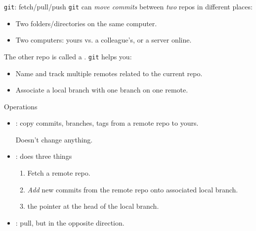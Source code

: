 \documentclass[12pt,aspectratio=169]{beamer}
\begin{document}
\begin{frame}{\texttt{git}: fetch/pull/push}
\texttt{git} can \emph{move commits} between \emph{two} repos in different places:
\begin{itemize}
  \item Two folders/directories on the same computer.
  \item Two computers: yours vs. a colleague's, or a server online.
\end{itemize}

The other repo is called a . \texttt{git} helps you:
  \begin{itemize}
    \item Name and track multiple remotes related to the current repo.
    \item Associate a local branch with one branch on one remote.
  \end{itemize}

Operations
\begin{itemize}
  \item {}: copy commits, branches, tags from a remote repo to yours.

    Doesn't change anything.
  \item {}: does three things
    \begin{enumerate}
      \item Fetch a remote repo.
      \item \emph{Add} new commits from the remote repo onto associated local branch.
      \item {} the pointer at the head of the local branch.
    \end{enumerate}

  \item {}: pull, but in the opposite direction.
\end{itemize}

\end{frame}
\end{document}
